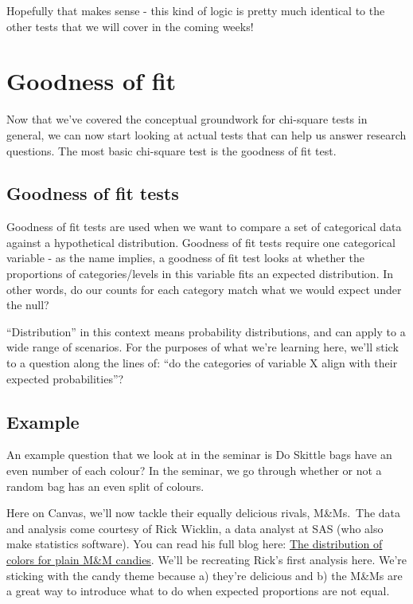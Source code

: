 \documentclass[
]{book}
\begin{document}
Hopefully that makes sense - this kind of logic is pretty much identical to the other tests that we will cover in the coming weeks!

\section{Goodness of fit}\label{goodness-of-fit}

Now that we've covered the conceptual groundwork for chi-square tests in general, we can now start looking at actual tests that can help us answer research questions. The most basic chi-square test is the goodness of fit test.

\subsection{Goodness of fit tests}\label{goodness-of-fit-tests}

Goodness of fit tests are used when we want to compare a set of categorical data against a hypothetical distribution. Goodness of fit tests require one categorical variable - as the name implies, a goodness of fit test looks at whether the proportions of categories/levels in this variable fits an expected distribution. In other words, do our counts for each category match what we would expect under the null?

``Distribution'' in this context means probability distributions, and can apply to a wide range of scenarios. For the purposes of what we're learning here, we'll stick to a question along the lines of: ``do the categories of variable X align with their expected probabilities''?

\subsection{Example}\label{example}

An example question that we look at in the seminar is Do Skittle bags have an even number of each colour? In the seminar, we go through whether or not a random bag has an even split of colours.

Here on Canvas, we'll now tackle their equally delicious rivals, M\&Ms.~The data and analysis come courtesy of Rick Wicklin, a data analyst at SAS (who also make statistics software). You can read his full blog here: \href{https://blogs.sas.com/content/iml/2017/02/20/proportion-of-colors-mandms.html}{The distribution of colors for plain M\&M candies}. We'll be recreating Rick's first analysis here. We're sticking with the candy theme because a) they're delicious and b) the M\&Ms are a great way to introduce what to do when expected proportions are not equal.
\end{document}
